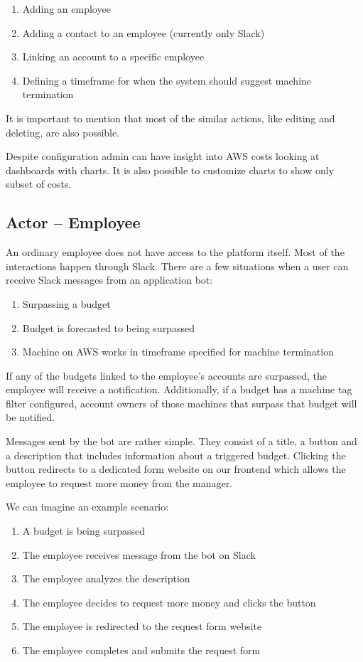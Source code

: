\documentclass[licencjacka,en]{thesisclass}
\begin{document}
    \begin{enumerate}
        \item Adding an employee
        \item Adding a contact to an employee (currently only Slack)
        \item Linking an account to a specific employee
        \item Defining a timeframe for when the system should suggest machine termination
    \end{enumerate}
    It is important to mention that most of the similar
    actions, like editing and deleting, are also possible.

    Despite configuration admin can have insight into AWS
    costs looking at dashboards with charts.
    It is also possible to customize charts to show only subset of costs.

    \subsection{Actor -- Employee}
    An ordinary employee does not have access to the platform itself.
    Most of the interactions happen through Slack.
    There are a few situations when a user can receive Slack messages from an application bot:

    \begin{enumerate}
        \item Surpassing a budget
        \item Budget is forecasted to being surpassed
        \item Machine on AWS works in timeframe specified for machine termination
    \end{enumerate}

    If any of the budgets linked to the employee's accounts are surpassed,
    the employee will receive a notification.
    Additionally, if a budget has a machine tag filter configured,
    account owners of those machines that surpass that budget will be notified.

    Messages sent by the bot are rather simple.
    They consist of a title, a button and a description that includes
    information about a triggered budget.
    Clicking the button redirects to a dedicated form website on our frontend
    which allows the employee to request more money from the manager.

    \bigskip

    We can imagine an example scenario:
    \begin{enumerate}
        \item A budget is being surpassed
        \item The employee receives message from the bot on Slack
        \item The employee analyzes the description
        \item The employee decides to request more money and clicks the button
        \item The employee is redirected to the request form website
        \item The employee completes and submits the request form
    \end{enumerate}
\end{document}
